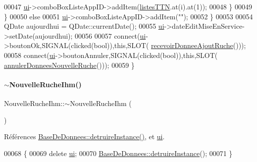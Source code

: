 \begin{DoxyCode}
00047                 \hyperlink{class_nouvelle_ruche_ihm_a46c1f0446fc75c67847d152d89d75960}{ui}->comboBoxListeAppID->addItem(\hyperlink{class_nouvelle_ruche_ihm_a0c97db3419bafe928aabed3aa01d46fb}{listesTTN}.at(i).at(1));
00048             \}
00049         \}
00050         \textcolor{keywordflow}{else}
00051             \hyperlink{class_nouvelle_ruche_ihm_a46c1f0446fc75c67847d152d89d75960}{ui}->comboBoxListeAppID->addItem(\textcolor{stringliteral}{""});
00052     \}
00053 
00054     QDate aujourdhui = QDate::currentDate();
00055     \hyperlink{class_nouvelle_ruche_ihm_a46c1f0446fc75c67847d152d89d75960}{ui}->dateEditMiseEnService->setDate(aujourdhui);
00056 
00057     connect(\hyperlink{class_nouvelle_ruche_ihm_a46c1f0446fc75c67847d152d89d75960}{ui}->boutonOk,SIGNAL(clicked(\textcolor{keywordtype}{bool})),\textcolor{keyword}{this},SLOT(
      \hyperlink{class_nouvelle_ruche_ihm_a268e781b033f2531ca5eab19cc828fdc}{recevoirDonneeAjoutRuche}()));
00058     connect(\hyperlink{class_nouvelle_ruche_ihm_a46c1f0446fc75c67847d152d89d75960}{ui}->boutonAnnuler,SIGNAL(clicked(\textcolor{keywordtype}{bool})),\textcolor{keyword}{this},SLOT(
      \hyperlink{class_nouvelle_ruche_ihm_a8967974b5606b7096960f3b607b5b58a}{annulerDonneesNouvelleRuche}()));
00059 \}
\end{DoxyCode}
\mbox{\label{class_nouvelle_ruche_ihm_a17e5dfd1146574134eaa3ab8eae4f6d4}} 
\paragraph{\texorpdfstring{$\sim$\+Nouvelle\+Ruche\+Ihm()}{~NouvelleRucheIhm()}}
{\footnotesize\ttfamily Nouvelle\+Ruche\+Ihm\+::$\sim$\+Nouvelle\+Ruche\+Ihm (\begin{DoxyParamCaption}{ }\end{DoxyParamCaption})}



Références \hyperlink{class_base_de_donnees_a457401c0816b888c77ce915997545f4e}{Base\+De\+Donnees\+::detruire\+Instance()}, et \hyperlink{class_nouvelle_ruche_ihm_a46c1f0446fc75c67847d152d89d75960}{ui}.


\begin{DoxyCode}
00068 \{
00069     \textcolor{keyword}{delete} \hyperlink{class_nouvelle_ruche_ihm_a46c1f0446fc75c67847d152d89d75960}{ui};
00070     \hyperlink{class_base_de_donnees_a457401c0816b888c77ce915997545f4e}{BaseDeDonnees::detruireInstance}();
00071 \}
\end{DoxyCode}


